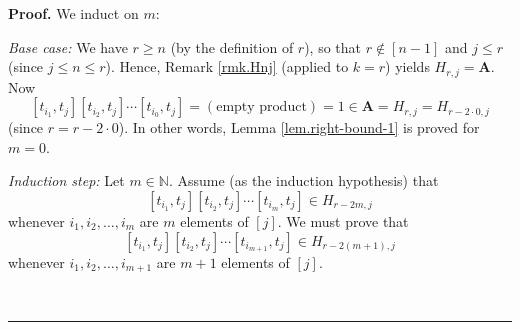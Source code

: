 \documentclass[numbers=enddot,12pt,final,onecolumn,notitlepage]{scrartcl}%
\theoremstyle{definition}
\newenvironment{proof}[1][Proof]{\noindent\textbf{#1.} }{\ \rule{0.5em}{0.5em}}
\begin{document}
\begin{proof}
We induct on $m$:

\textit{Base case:} We have $r\geq n$ (by the definition of $r$), so that
$r\notin\left[  n-1\right]  $ and $j\leq r$ (since $j\leq n\leq r$). Hence,
Remark \ref{rmk.Hnj} (applied to $k=r$) yields $H_{r,j}=\mathbf{A}$. Now%
\[
\left[  t_{i_{1}},t_{j}\right]  \left[  t_{i_{2}},t_{j}\right]  \cdots\left[
t_{i_{0}},t_{j}\right]  =\left(  \text{empty product}\right)  =1\in
\mathbf{A}=H_{r,j}=H_{r-2\cdot0,j}%
\]
(since $r=r-2\cdot0$). In other words, Lemma \ref{lem.right-bound-1} is proved
for $m=0$.

\textit{Induction step:} Let $m\in\mathbb{N}$. Assume (as the induction
hypothesis) that
\begin{equation}
\left[  t_{i_{1}},t_{j}\right]  \left[  t_{i_{2}},t_{j}\right]  \cdots\left[
t_{i_{m}},t_{j}\right]  \in H_{r-2m,j} \label{pf.lem.right-bound-1.IH}%
\end{equation}
whenever $i_{1},i_{2},\ldots,i_{m}$ are $m$ elements of $\left[  j\right]  $.
We must prove that%
\begin{equation}
\left[  t_{i_{1}},t_{j}\right]  \left[  t_{i_{2}},t_{j}\right]  \cdots\left[
t_{i_{m+1}},t_{j}\right]  \in H_{r-2\left(  m+1\right)  ,j}
\label{pf.lem.right-bound-1.IG}%
\end{equation}
whenever $i_{1},i_{2},\ldots,i_{m+1}$ are $m+1$ elements of $\left[  j\right]
$.


\end{proof}
\end{document}
